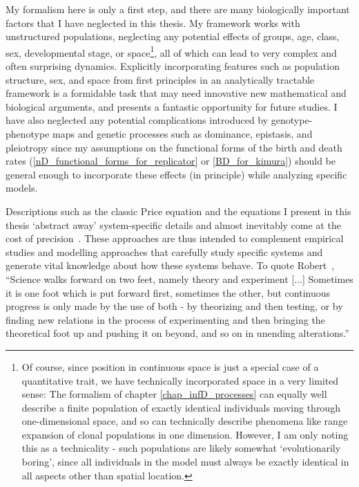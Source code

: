 My formalism here is only a first step, and there are many biologically important factors that I have neglected in this thesis. My framework works with unstructured populations, neglecting any potential effects of groups, age, class, sex, developmental stage, or space\footnote{Of course,  since position in continuous space is just a special case of a quantitative trait, we have technically incorporated space in a very limited sense: The formalism of chapter \ref{chap_infD_processes} can equally well describe a finite population of exactly identical individuals moving through one-dimensional space, and so can technically describe phenomena like range expansion of clonal populations in one dimension. However, I am only noting this as a technicality - such populations are likely somewhat `evolutionarily boring', since all individuals in the model must always be exactly identical in all aspects other than spatial location.}, all of which can lead to very complex and often surprising dynamics. Explicitly incorporating features such as population structure, sex, and space from first principles in an analytically tractable framework is a formidable task that may need innovative new mathematical and biological arguments, and presents a fantastic opportunity for future studies. I have also neglected any potential complications introduced by genotype-phenotype maps and genetic processes such as dominance, epistasis, and pleiotropy since my assumptions on the functional forms of the birth and death rates (\eqref{nD_functional_forms_for_replicator} or \eqref{BD_for_kimura}) should be general enough to incorporate these effects (in principle) while analyzing specific models.

Descriptions such as the classic Price equation and the equations I present in this thesis `abstract away' system-specific details and almost inevitably come at the cost of precision~\citep{levins_strategy_1966, potochnik_idealization_2018}. These approaches are thus intended to complement empirical studies and modelling approaches that carefully study specific systems and generate vital knowledge about how these systems behave. To quote Robert~\citet{millikan_electron_1924}, ``Science walks forward on two feet, namely theory and experiment [...] Sometimes it is one foot which is put forward first, sometimes the other, but continuous progress is only made by the use of both - by theorizing and then testing, or by finding new relations in the process of experimenting and then bringing the theoretical foot up and pushing it on beyond, and so on in unending alterations.''